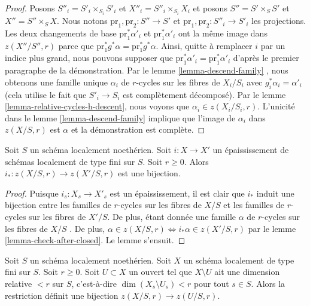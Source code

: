 \begin{proof}
\medskip\noindent
 Posons  $S''_i = S'_i \times_{S_i} S'_i$  et  $X''_i = S''_i \times_{S_i} X_i$
  et posons  $S'' = S' \times_S S'$  et  $X'' = S'' \times_S X$.
 Nous notons  $\text{pr}_1, \text{pr}_2 : S'' \to S'$  et  
$\text{pr}_1, \text{pr}_2 : S''_i \to S'_i$  les projections. Les
 deux changements de base $\text{pr}_1^*\alpha'_i$  et  $\text{pr}_1^*\alpha'_i$
  ont la même image dans  $z(X''/S'', r)$  parce que  
$\text{pr}_1^*g^*\alpha = \text{pr}_1^*g^*\alpha$.
 Ainsi, quitte à remplacer  $i$  par un indice plus grand, nous pouvons supposer que  
$\text{pr}_1^*\alpha'_i = \text{pr}_1^*\alpha'_i$
  d'après le premier paragraphe de la démonstration. 
Par le lemme \ref{lemma-descend-family} , 
nous obtenons une famille unique  $\alpha_i$
  de  $r$-cycles sur les fibres de  $X_i/S_i$
  avec  $g_i^*\alpha_i = \alpha'_i$  (cela utilise le fait que $S'_i \to S_i$
  est complètement décomposé). Par
 le lemme \ref{lemma-relative-cycles-h-descent}, nous
 voyons que  $\alpha_i \in z(X_i/S_i, r)$.
 L'unicité dans le lemme \ref{lemma-descend-family} implique que 
l'image de $\alpha_i$  dans  $z(X/S, r)$  est  $\alpha$  et la démonstration est complète. 
\end{proof} 

\begin{lemma} 
\label{lemma-thickening} 
Soit  $S$  un schéma localement noethérien. Soit  $i : X \to X'$  un épaississement
 de schémas localement de type fini sur  $S$. Soit $r \geq 0$. 
Alors  $i_* : z(X/S, r) \to z(X'/S, r)$  est une bijection. 
\end{lemma} 

\begin{proof} 
Puisque  $i_s : X_s \to X'_s$  est un épaississement, il est clair que  $i_*$  induit 
une bijection entre les
 familles de  $r$-cycles sur les fibres de $X/S$  et 
les familles de  $r$-cycles sur les fibres de $X'/S$. 
De plus, étant donnée une famille  $\alpha$  de $r$-cycles sur les fibres de  $X/S$
 . De plus, $\alpha \in z(X/S, r) \Leftrightarrow i_*\alpha \in z(X'/S, r)$
  par le lemme \ref{lemma-check-after-closed}. Le lemme s'ensuit. 
\end{proof} 

\begin{lemma} 
\label{lemma-extend-to-larger} 
Soit  $S$  un schéma localement noethérien. Soit  $X$  un schéma localement
 de type fini sur  $S$. Soit  $r \geq 0$. Soit  $U \subset X$  un ouvert
 tel que  $X \setminus U$  ait une dimension relative  $< r$  sur $S$, c'est-à-dire  
$\dim(X_s \setminus U_s) < r$  pour tout  $s \in S$. Alors
 la restriction définit une bijection  $z(X/S, r) \to z(U/S, r)$. 
\end{lemma} 

